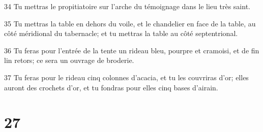 \par 34 Tu mettras le propitiatoire sur l'arche du témoignage dans le lieu très saint.
\par 35 Tu mettras la table en dehors du voile, et le chandelier en face de la table, au côté méridional du tabernacle; et tu mettras la table au côté septentrional.
\par 36 Tu feras pour l'entrée de la tente un rideau bleu, pourpre et cramoisi, et de fin lin retors; ce sera un ouvrage de broderie.
\par 37 Tu feras pour le rideau cinq colonnes d'acacia, et tu les couvriras d'or; elles auront des crochets d'or, et tu fondras pour elles cinq bases d'airain.

\chapter{27}

